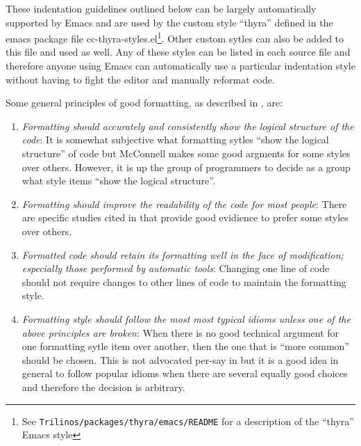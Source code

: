 These indentation guidelines outlined below can be largely automatically
supported by Emacs and are used by the custom style ``thyra'' defined in the
emacs package file cc-thyra-styles.el\footnote{See
{}\texttt{Trilinos/packages/thyra/emacs/README} for a description of the
``thyra'' Emacs style}.  Other custom sytles can also be added to this file
and used as well.  Any of these styles can be listed in each source file and
therefore anyone using Emacs can automatically use a particular indentation
style without having to fight the editor and manually reformat code.

Some general principles of good formatting, as described in {}\cite[Section
31.1]{CodeComplete2nd04}, are:

\begin{enumerate}

{}\item\textit{Formatting should accurately and consistently show the logical
structure of the code}: It is somewhat subjective what formatting sytles
``show the logical structure'' of code but McConnell makes some good argments
for some styles over others.  However, it is up the group of programmers to
decide as a group what style items ``show the logical structure''.

{}\item\textit{Formatting should improve the readability of the code for most
people}: There are specific studies cited in {}\cite[Chapter
31]{CodeComplete2nd04} that provide good evidience to prefer some styles over
others.

{}\item\textit{Formatted code should retain its formatting well in the face of
modification; especially those performed by automatic tools}: Changing one
line of code should not require changes to other lines of code to maintain the
formatting style.

{}\item\textit{Formatting style should follow the most most typical idioms
unless one of the above principles are broken}: When there is no good
technical argument for one formatting sytle item over another, then the one
that is ``more common'' should be chosen.  This is not advocated per-say in
{}\cite[Chapter 31]{CodeComplete2nd04} but it is a good idea in general to
follow popular idioms when there are several equally good choices and
therefore the decision is arbitrary.

\end{enumerate}


